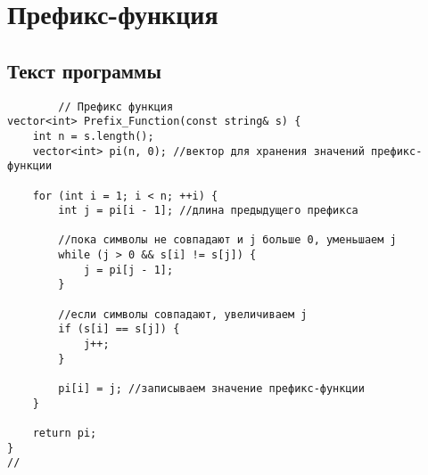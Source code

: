 \documentclass[bachelor, och, referat, times]{SCWorks}
\begin{document}
    
   
    
    \maketitle

    
    

    
    
   \tableofcontents
    
    
    
    

    \section{Префикс-функция}
    \subsection{Текст программы}
       \begin{verbatim}
        // Префикс функция
vector<int> Prefix_Function(const string& s) {
    int n = s.length();
    vector<int> pi(n, 0); //вектор для хранения значений префикс-функции

    for (int i = 1; i < n; ++i) {
        int j = pi[i - 1]; //длина предыдущего префикса

        //пока символы не совпадают и j больше 0, уменьшаем j
        while (j > 0 && s[i] != s[j]) {
            j = pi[j - 1];
        }

        //если символы совпадают, увеличиваем j
        if (s[i] == s[j]) {
            j++;
        }

        pi[i] = j; //записываем значение префикс-функции
    }

    return pi;
}
//

 \end{verbatim}
\end{document}
